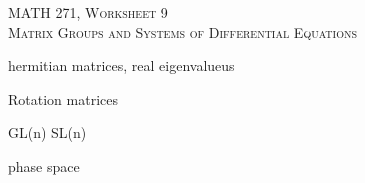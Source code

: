 \documentclass[12pt]{article} %
\begin{document}
\begin{center}
   \textsc{\large MATH 271, Worksheet 9}\\
   \textsc{Matrix Groups and Systems of Differential Equations}
\end{center}
\vspace{.5cm}

\begin{problem}
hermitian matrices, real eigenvalueus
\end{problem}

\begin{problem}
Rotation matrices
\end{problem}

\begin{problem}
GL(n) SL(n)
\end{problem}

\begin{problem}
phase space
\end{problem}
\end{document}
